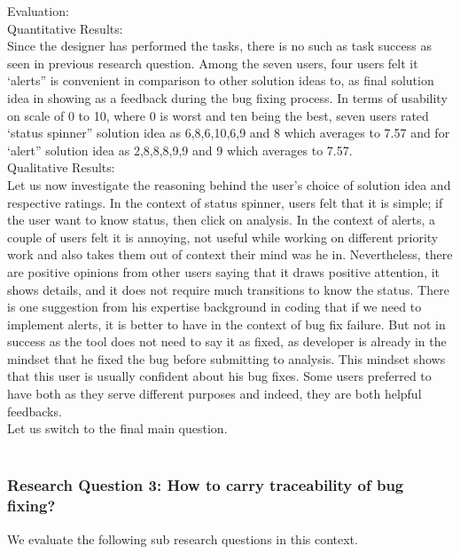 Evaluation: \\

Quantitative Results: \\

Since the designer has performed the tasks, there is no such as task success as seen in previous research question. Among the seven users, four users felt it ‘alerts” is convenient in comparison to other solution ideas to, as final solution idea in showing as a feedback during the bug fixing process. In terms of usability on scale of 0 to 10, where 0 is worst and ten being the best, seven users rated ‘status spinner” solution idea as 6,8,6,10,6,9 and 8 which averages to 7.57 and for ‘alert” solution idea as 2,8,8,8,9,9 and 9 which averages to 7.57. \\

Qualitative Results: \\

Let us now investigate the reasoning behind the user’s choice of solution idea and respective ratings. In the context of status spinner, users felt that it is simple; if the user want to know status, then click on analysis. In the context of alerts, a couple of users felt it is annoying, not useful while working on different priority work and also takes them out of context their mind was he in. Nevertheless, there are positive opinions from other users saying that it draws positive attention, it shows details, and it does not require much transitions to know the status. There is one suggestion from his expertise background in coding that if we need to implement alerts, it is better to have in the context of bug fix failure. But not in success as the tool does not need to say it as fixed, as developer is already in the mindset that he fixed the bug before submitting to analysis. This mindset shows that this user is usually confident about his bug fixes. Some users preferred to have both as they serve different purposes and indeed, they are both helpful feedbacks. \\

Let us switch to the final main question. \\ \\

\subsubsection{Research Question 3: How to carry traceability of bug fixing?}

We evaluate the following sub research questions in this context. \\

